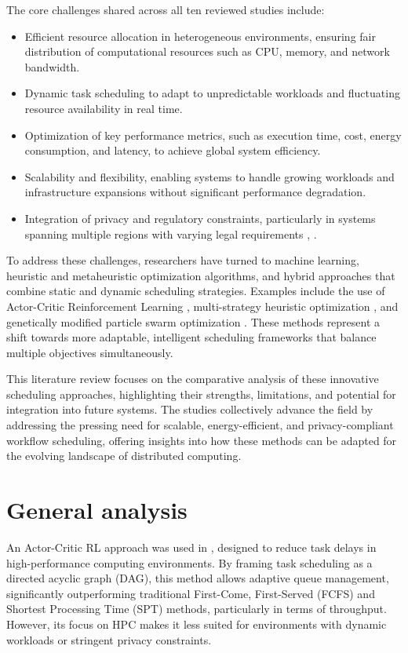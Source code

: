 \documentclass[a4paper, final]{article}
\begin{document}
The core challenges shared across all ten reviewed studies include:

\begin{itemize}
\item Efficient resource allocation in heterogeneous environments, ensuring fair distribution of computational resources 
such as CPU, memory, and network bandwidth.
\item Dynamic task scheduling to adapt to unpredictable workloads and fluctuating resource availability in real time.
\item Optimization of key performance metrics, such as execution time, cost, energy consumption, and latency, to achieve 
global system efficiency.
\item Scalability and flexibility, enabling systems to handle growing workloads and infrastructure expansions without 
significant performance degradation.
\item Integration of privacy and regulatory constraints, particularly in systems spanning multiple regions with varying 
legal requirements \cite{bib:7_ppps}, \cite{bib:10}.
\end{itemize}

To address these challenges, researchers have turned to machine learning, heuristic and metaheuristic optimization 
algorithms, and hybrid approaches that combine static and dynamic scheduling strategies. Examples include the use of 
Actor-Critic Reinforcement Learning \cite{bib:1_acrl}, multi-strategy heuristic optimization \cite{bib:3_sandcat}, and 
genetically modified particle swarm optimization \cite{bib:10}. These methods represent a shift towards more adaptable, 
intelligent scheduling frameworks that balance multiple objectives simultaneously.

This literature review focuses on the comparative analysis of these innovative scheduling approaches, highlighting 
their strengths, limitations, and potential for integration into future systems. The studies collectively advance the 
field by addressing the pressing need for scalable, energy-efficient, and privacy-compliant workflow scheduling, 
offering insights into how these methods can be adapted for the evolving landscape of distributed computing.

\newpage
\section{General analysis}

An Actor-Critic RL approach was used in \cite{bib:1_acrl}, designed to reduce task delays in high-performance 
computing environments. By framing task scheduling as a directed acyclic graph (DAG), this method allows 
adaptive queue management, significantly outperforming traditional First-Come, First-Served (FCFS) and 
Shortest Processing Time (SPT) methods, particularly in terms of throughput. However, its focus on HPC makes 
it less suited for environments with dynamic workloads or stringent privacy constraints.
\end{document}
